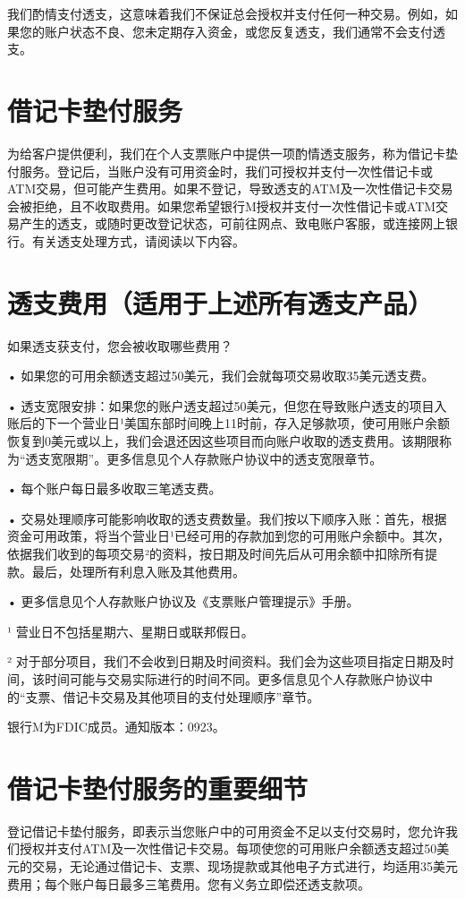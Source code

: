 \documentclass[UTF8,fontset=none,11pt,a4paper]{ctexart}
\begin{document}
我们酌情支付透支，这意味着我们不保证总会授权并支付任何一种交易。例如，如果您的账户状态不良、您未定期存入资金，或您反复透支，我们通常不会支付透支。


\section*{借记卡垫付服务}
为给客户提供便利，我们在个人支票账户中提供一项酌情透支服务，称为借记卡垫付服务。登记后，当账户没有可用资金时，我们可授权并支付一次性借记卡或ATM交易，但可能产生费用。如果不登记，导致透支的ATM及一次性借记卡交易会被拒绝，且不收取费用。如果您希望银行M授权并支付一次性借记卡或ATM交易产生的透支，或随时更改登记状态，可前往网点、致电账户客服，或连接网上银行。有关透支处理方式，请阅读以下内容。


\section*{透支费用（适用于上述所有透支产品）}
如果透支获支付，您会被收取哪些费用？


• 如果您的可用余额透支超过50美元，我们会就每项交易收取35美元透支费。


• 透支宽限安排：如果您的账户透支超过50美元，但您在导致账户透支的项目入账后的下一个营业日¹美国东部时间晚上11时前，存入足够款项，使可用账户余额恢复到0美元或以上，我们会退还因这些项目而向账户收取的透支费用。该期限称为“透支宽限期”。更多信息见个人存款账户协议中的透支宽限章节。


• 每个账户每日最多收取三笔透支费。


• 交易处理顺序可能影响收取的透支费数量。我们按以下顺序入账：首先，根据资金可用政策，将当个营业日¹已经可用的存款加到您的可用账户余额中。其次，依据我们收到的每项交易²的资料，按日期及时间先后从可用余额中扣除所有提款。最后，处理所有利息入账及其他费用。


• 更多信息见个人存款账户协议及《支票账户管理提示》手册。


¹ 营业日不包括星期六、星期日或联邦假日。


² 对于部分项目，我们不会收到日期及时间资料。我们会为这些项目指定日期及时间，该时间可能与交易实际进行的时间不同。更多信息见个人存款账户协议中的“支票、借记卡交易及其他项目的支付处理顺序”章节。


银行M为FDIC成员。通知版本：0923。


\section*{借记卡垫付服务的重要细节}
登记借记卡垫付服务，即表示当您账户中的可用资金不足以支付交易时，您允许我们授权并支付ATM及一次性借记卡交易。每项使您的可用账户余额透支超过50美元的交易，无论通过借记卡、支票、现场提款或其他电子方式进行，均适用35美元费用；每个账户每日最多三笔费用。您有义务立即偿还透支款项。
\end{document}
